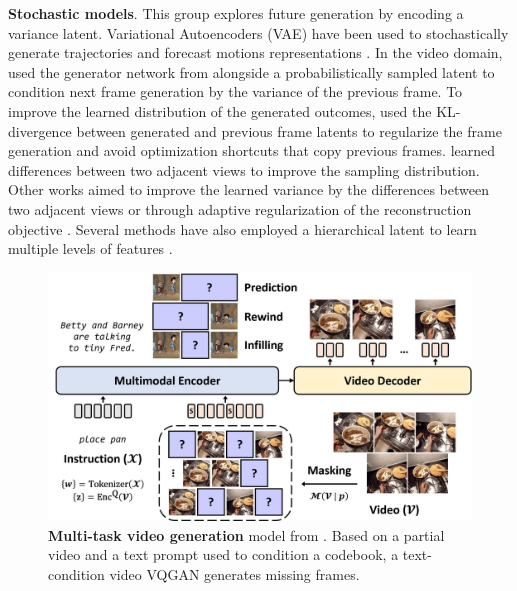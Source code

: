 \noindent
\textbf{Stochastic models}. This group explores future generation by encoding a variance latent. Variational Autoencoders (VAE)  have been used to stochastically generate trajectories  and forecast motions representations . In the video domain,   used the generator network from  alongside a probabilistically sampled latent to condition next frame generation by the variance of the previous frame. To improve the learned distribution of the generated outcomes,  used the KL-divergence between generated and previous frame latents to regularize the frame generation and avoid optimization shortcuts that copy previous frames.  learned differences between two adjacent views to improve the sampling distribution. Other works aimed to improve the learned variance by the differences between two adjacent views  or through adaptive regularization of the reconstruction objective . Several methods have also employed a hierarchical latent to learn multiple levels of features . 

\begin{figure}[t]
    \includegraphics[width=\linewidth]{figs/fig_mmvg.jpg}
    \caption{\textbf{Multi-task video generation} model from . Based on a partial video and a text prompt used to condition a codebook, a text-condition video VQGAN generates missing frames.}
    \label{fig:mmvg}
\end{figure}


